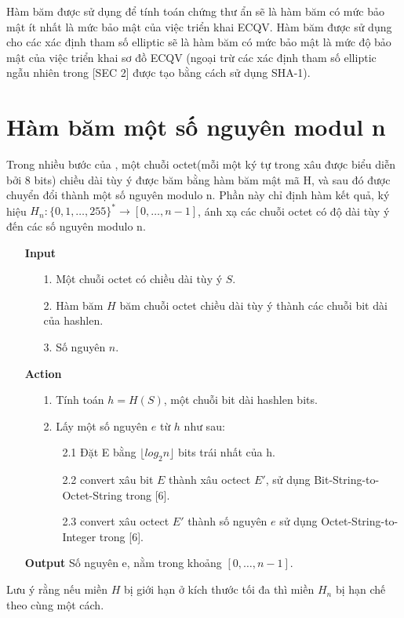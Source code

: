 \documentclass[a4paper,12pt]{report}
\begin{document}
Hàm băm được sử dụng để tính toán chứng thư ẩn sẽ là hàm băm có mức bảo mật ít nhất là mức bảo mật của việc triển khai ECQV. Hàm băm được sử dụng cho các xác định tham số  elliptic sẽ là hàm băm có mức bảo mật là mức độ bảo mật của việc triển khai sơ đồ ECQV (ngoại trừ các xác định tham số elliptic ngẫu nhiên trong [SEC 2] được tạo bằng cách sử dụng SHA-1).
\section{Hàm băm một số nguyên modul n}
Trong nhiều bước của , một chuỗi octet(mỗi một ký tự trong xâu được biểu diễn bởi 8 bits) chiều dài tùy ý được băm bằng hàm băm mật mã H, và sau đó được chuyển đổi thành một số nguyên modulo n. Phần này chỉ định hàm kết quả, ký hiệu $H_n: \{0, 1,\ldots , 255\}^{*} \rightarrow [0,\ldots , n - 1]$, ánh xạ các chuỗi octet có độ dài tùy ý đến các số nguyên modulo n.
\begin{itemize}
\item[] \textbf{Input}
\begin{itemize}
\item[1. ] Một chuỗi octet có chiều dài tùy ý $S$.
\item[2. ] Hàm băm $H$ băm chuỗi octet chiều dài tùy ý thành các chuỗi bit dài của hashlen.
\item[3. ] Số nguyên $n$.
\end{itemize}
\item[] \textbf{Action}
\begin{itemize}
\item[1. ] Tính toán $h = H(S)$, một chuỗi bit dài hashlen bits.
\item[2. ] Lấy một số nguyên $e$ từ $h$ như sau:
\begin{itemize}
\item[2.1 ] Đặt E bằng $\lfloor log_2{n} \rfloor$ bits trái nhất của h.
\item[2.2 ] convert xâu bit $E$ thành xâu octect $E'$, sử dụng  Bit-String-to-Octet-String trong [6].
\item[2.3 ] convert xâu octect $E'$ thành số nguyên $e$ sử dụng Octet-String-to-Integer trong [6].
\end{itemize}
\end{itemize}
\item[] \textbf{Output} Số nguyên e, nằm trong khoảng $[0,\ldots , n - 1]$.
\end{itemize}
Lưu ý rằng nếu miền $H$ bị giới hạn ở kích thước tối đa thì miền $H_n$ bị hạn chế theo cùng một cách. 
\end{document}

